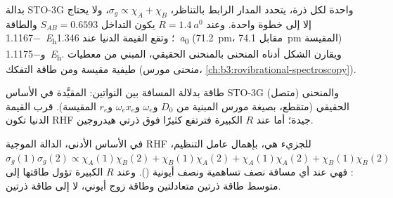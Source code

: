 \begin{example}\label{ex:b3:computational-chemistry:h2}
بدالة STO-3G واحدة لكل ذرة، يتحدد المدار الرابط بالتناظر،
$\sigma_g \propto \chi_A + \chi_B$، ولا يحتاج  إلا إلى خطوة واحدة. وعند $R =
\qty{1.4}{\bohr}$ يكون التداخل $S_{AB} = 0.6593$ والطاقة
\qty{-1.1167}{\hartree}؛ وتقع القيمة الدنيا عند \qty{1.346}{\bohr} (\qty{71.2}{pm}،
مقابل \qty{74.1}{pm} المقيسة) و\qty{-1.1175}{\hartree}. ويقارن الشكل أدناه
المنحنى بالمنحنى الحقيقي، المبني من معطيات طيفية
مقيسة ومن طاقة التفكك (منحنى مورس، \cref{ch:b3:rovibrational-spectroscopy}).
\end{example}

\begin{omfigure}

{\small طاقة  بدلالة المسافة بين النواتين:  المقيَّدة في الأساس STO-3G (متصل) والمنحنى الحقيقي (متقطع، بصيغة
مورس المبنية من $D_0$ و$\omega_e$ و$\omega_ex_e$ و$r_e$ المقيسة). قرب
القيمة الدنيا تكون RHF جيدة؛ أما عند $R$ الكبيرة فترتفع كثيرًا فوق ذرتي هيدروجين.}
\end{omfigure}

\begin{proposition}\label{prop:b3:computational-chemistry:rhf-dissociation}
في الأساس الأدنى، الدالة الموجية RHF للجزيء  هي، بإهمال
عامل التنظيم، $\sigma_g(1)\sigma_g(2) \propto \chi_A(1)\chi_B(2) + \chi_B(1)\chi_A(2)
+ \chi_A(1)\chi_A(2) + \chi_B(1)\chi_B(2)$: فهي عند أي مسافة نصف تساهمية ونصف
أيونية (). وعند $R$ الكبيرة تؤول طاقتها إلى متوسط طاقة ذرتين
متعادلتين وطاقة زوج أيوني، لا إلى طاقة ذرتين.
\end{proposition}

